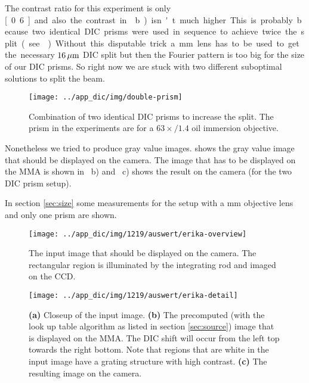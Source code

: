 The contrast ratio for this experiment is only \unit[0.6] and also the
contrast in ~b) isn't much higher. This is
probably because two identical DIC prisms were used in sequence to
achieve twice the split (see ). Without this
disputable trick a \unit[200]{mm} lens has to be used to get the
necessary $\unit[16]{\mu m}$ DIC split but then the Fourier pattern is
too big for the size of our DIC prisms. So right now we are stuck with
two different suboptimal solutions to split the beam.

\begin{figure}[htb]
  \centering
  \texttt{[image: ../app\_dic/img/double-prism]}
  \caption{Combination of two identical DIC prisms to increase the
    split. The prism in the experiments are for a $63\times/1.4$ oil
    immersion objective.}
  \label{fig:double-prism}
\end{figure}

Nonetheless we tried to produce gray value images.
 shows the gray value image that should be
displayed on the camera. The image that has to be displayed on the MMA
is shown in ~b) and
~c) shows the result on the camera (for the
two DIC prism setup).

In section \ref{sec:size} some measurements for the setup with a
\unit[200]{mm} objective lens and only one prism are shown.

\begin{figure}[p]
  \centering
  \texttt{[image: ../app\_dic/img/1219/auswert/erika-overview]}
  \caption{The input image that should be displayed on the camera. The
    rectangular region is illuminated by the integrating rod and
    imaged on the CCD.}
  \label{fig:erika-overview}
\end{figure}

\begin{figure}[p]
  \centering
  \texttt{[image: ../app\_dic/img/1219/auswert/erika-detail]}
  \caption{{\bf (a)} Closeup of the input image. {\bf (b)} The
    precomputed (with the look up table algorithm as listed in section
    \ref{sec:source}) image that is displayed on the MMA. The DIC
    shift will occur from the left top towards the right bottom. Note
    that regions that are white in the input image have a grating
    structure with high contrast. {\bf (c)} The resulting image on the
    camera.}
  \label{fig:erika-detail}
\end{figure}

